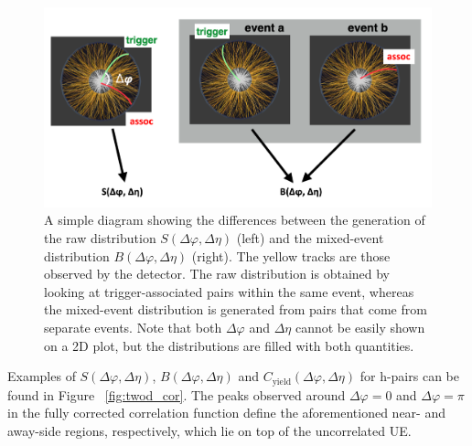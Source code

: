 \begin{figure}
\centering
\includegraphics[width=\textwidth]{figures/mnm/mixed_event_cartoon.png}
\caption{A simple diagram showing the differences between the generation of the raw distribution $S(\Delta\varphi, \Delta\eta)$ (left) and the mixed-event distribution $B(\Delta\varphi, \Delta\eta)$ (right). The yellow tracks are those observed by the detector. The raw distribution is obtained by looking at trigger-associated pairs within the same event, whereas the mixed-event distribution is generated from pairs that come from separate events. Note that both $\Delta\varphi$ and $\Delta\eta$ cannot be easily shown on a 2D plot, but the distributions are filled with both quantities.}
\label{fig:mixed_event_cartoon}
\end{figure}

Examples of $S(\Delta\varphi, \Delta\eta)$, $B(\Delta\varphi, \Delta\eta)$ and $C_{\text{yield}}(\Delta\varphi, \Delta\eta)$ for h-\lmb pairs can be found in Figure ~\ref{fig:twod_cor}. The peaks observed around $\Delta\varphi = 0$ and $\Delta\varphi = \pi$ in the fully corrected correlation function define the aforementioned near- and away-side regions, respectively, which lie on top of the uncorrelated UE.

